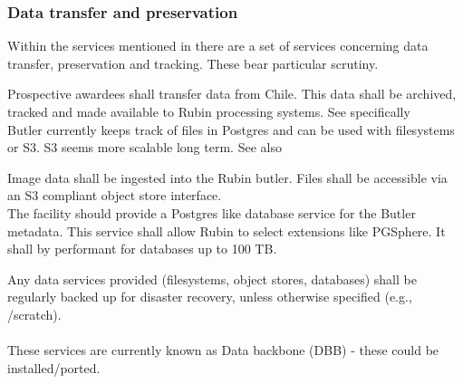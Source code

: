 \subsubsection{Data transfer and preservation}
Within the services mentioned in  there are a set of services concerning data
transfer, preservation and tracking. These bear particular scrutiny.

\reqsimp{}{}{}{}{}
{
 Prospective awardees shall transfer data from Chile. This data shall be archived, tracked and made
 available to Rubin processing systems.  See specifically 
}\\

Butler currently keeps track of files in Postgres and can be used with filesystems or S3.
S3 seems more scalable long term. See also 

\reqsimp{}{}{}{}{}
{
 Image data shall be ingested into the Rubin butler. Files shall be accessible via an
 S3 compliant object store interface.
}\\

\reqsimp{}{}{}{}{}{}
{
	The facility  should provide a Postgres like database service for the Butler metadata.
	This service shall allow Rubin to  select extensions like PGSphere.
	It shall by performant for databases up to 100 TB.
	}

\reqsimp{}{}{}{}{}{}
{
	Any data services provided (filesystems, object stores, databases) shall be regularly backed up for disaster recovery, unless otherwise specified (e.g., /scratch).
}\\\\


These services are currently known  as Data backbone (DBB) - these could be installed/ported.




